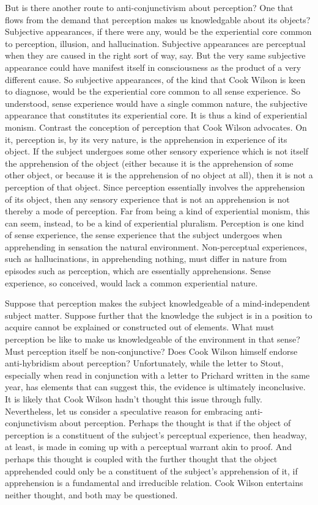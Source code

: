 \documentclass[12pt]{article}
\begin{document}
But is there another route to anti-conjunctivism about perception? One that flows from the demand that perception makes us knowledgable about its objects? Subjective appearances, if there were any, would be the experiential core common to perception, illusion, and hallucination. Subjective appearances are perceptual when they are caused in the right sort of way, say. But the very same subjective appearance could have manifest itself in consciousness as the product of a very different cause. So subjective appearances, of the kind that Cook Wilson is keen to diagnose, would be the experiential core common to all sense experience. So understood, sense experience would have a single common nature, the subjective appearance that constitutes its experiential core. It is thus a kind of experiential monism. Contrast the conception of perception that Cook Wilson advocates. On it, perception is, by its very nature, is the apprehension in experience of its object. If the subject undergoes some other sensory experience which is not itself the apprehension of the object (either because it is the apprehension of some other object, or because it is the apprehension of no object at all), then it is not a perception of that object. Since perception essentially involves the apprehension of its object, then any sensory experience that is not an apprehension is not thereby a mode of perception. Far from being a kind of experiential monism, this can seem, instead, to be a kind of experiential pluralism. Perception is one kind of sense experience, the sense experience that the subject undergoes when apprehending in sensation the natural environment. Non-perceptual experiences, such as hallucinations, in apprehending nothing, must differ in nature from episodes such as perception, which are essentially apprehensions. Sense experience, so conceived, would lack a common experiential nature.

Suppose that perception makes the subject knowledgeable of a mind-independent subject matter. Suppose further that the knowledge the subject is in a position to acquire cannot be explained or constructed out of elements. What must perception be like to make us knowledgeable of the environment in that sense? Must perception itself be non-conjunctive? Does Cook Wilson himself endorse anti-hybridism about perception?  Unfortunately, while the letter to Stout, especially when read in conjunction with a letter to Prichard written in the same year, has elements that can suggest this, the evidence is ultimately inconclusive. It is likely that Cook Wilson hadn't thought this issue through fully. Nevertheless, let us consider a speculative reason for embracing anti-conjunctivism about perception. Perhaps the thought is that if the object of perception is a constituent of the subject's perceptual experience, then headway, at least, is made in coming up with a perceptual warrant akin to proof. And perhaps this thought is coupled with the further thought that the object apprehended could only be a constituent of the subject's apprehension of it, if apprehension is a fundamental and irreducible relation. Cook Wilson entertains neither thought, and both may be questioned.
\end{document}
